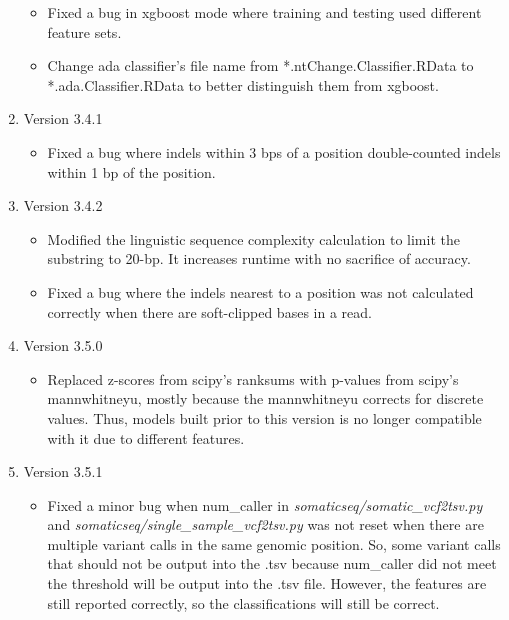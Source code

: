 \documentclass[10pt,letterpaper]{article}
\begin{document}
\begin{sloppypar}
\begin{enumerate}
\begin{itemize}
            \item Fixed a bug in xgboost mode where training and testing used different feature sets. 

            \item Change ada classifier's file name from *.ntChange.Classifier.RData to *.ada.Classifier.RData to better distinguish them from xgboost. 
		
		\end{itemize}

		
	\item Version 3.4.1
	
		\begin{itemize}
            \item Fixed a bug where indels within 3 bps of a position double-counted indels within 1 bp of the position.
		
		\end{itemize}


	\item Version 3.4.2

        \begin{itemize}
            \item Modified the linguistic sequence complexity calculation to limit the substring to 20-bp. It increases runtime with no sacrifice of accuracy.

            \item Fixed a bug where the indels nearest to a position was not calculated correctly when there are soft-clipped bases in a read.

		\end{itemize}


	\item Version 3.5.0

        \begin{itemize}
            \item Replaced z-scores from scipy's ranksums with p-values from scipy's mannwhitneyu, mostly because the mannwhitneyu corrects for discrete values. Thus, models built prior to this version is no longer compatible with it due to different features. 
		\end{itemize}


	\item Version 3.5.1

        \begin{itemize}
            \item Fixed a minor bug when num\_caller in \textit{somaticseq/somatic\_vcf2tsv.py} and \textit{somaticseq/single\_sample\_vcf2tsv.py} was not reset when there are multiple variant calls in the same genomic position. So, some variant calls that should not be output into the .tsv because num\_caller did not meet the threshold will be output into the .tsv file. However, the features are still reported correctly, so the classifications will still be correct. 


\end{itemize}
\end{enumerate}
\end{sloppypar}
\end{document}
